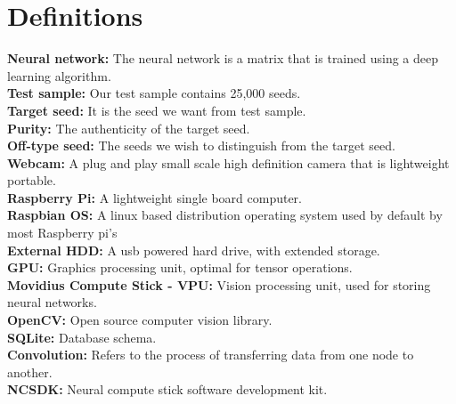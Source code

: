 \section{Definitions}
\textbf{Neural network:} The neural network is a matrix that is trained using a deep learning algorithm. \\
\textbf{Test sample:} Our test sample contains 25,000 seeds. \\
\textbf{Target seed:} It is the seed we want from test sample. \\
\textbf{Purity:} The authenticity of the target seed. \\
\textbf{Off-type seed:} The seeds we wish to distinguish from the target seed. \\
\textbf{Webcam:} A plug and play small scale high definition camera that is lightweight portable. \\
\textbf{Raspberry Pi:} A lightweight single board computer. \\
\textbf{Raspbian OS:} A linux based distribution operating system used by default by most Raspberry pi's\\
\textbf{External HDD:} A usb powered hard drive, with extended storage. \\
\textbf{GPU:} Graphics processing unit, optimal for tensor operations. \\
\textbf{Movidius Compute Stick - VPU:} Vision processing unit, used for storing neural networks.\\
\textbf{OpenCV:} Open source computer vision library. \\
\textbf{SQLite:} Database schema. \\
\textbf{Convolution:} Refers to the process of transferring data from one node to another. \\
\textbf{NCSDK:} Neural compute stick software development kit. \\
